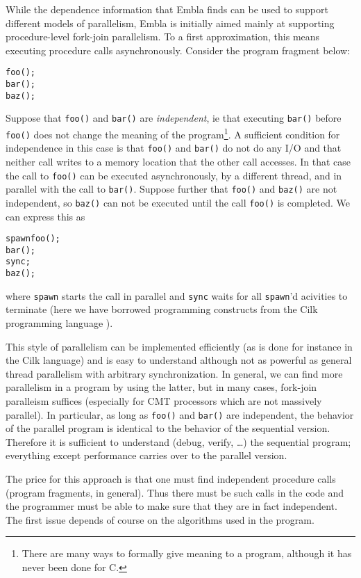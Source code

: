 While the dependence information that Embla finds can be used to 
support different models of parallelism, 
Embla is initially aimed mainly at supporting procedure-level 
fork-join parallelism. To a first approximation, this means executing 
procedure calls asynchronously. Consider the program fragment below:
\begin{alltt}
   foo();
   bar();
   baz();
\end{alltt}
Suppose that {\tt foo()} and {\tt bar()} are {\em independent}, ie that 
executing {\tt bar()} before {\tt foo()} does not change the meaning of
the program\footnote{There are many ways to formally give meaning to a
program, although it has never been done for C.}. A sufficient condition 
for independence
in this case is that {\tt foo()} and {\tt bar()} do not do any I/O and
that neither call writes to a memory location that the other call 
accesses. In that case the call to {\tt foo()} can be executed
asynchronously, 
by a different thread, and in parallel with the call to {\tt bar()}.
Suppose further that {\tt foo()} and {\tt baz()} are not independent,
so {\tt baz()} can not be executed until the call {\tt foo()} is completed.
We can express this as 
\begin{alltt}
   spawn foo();
   bar();
   sync;
   baz();
\end{alltt}
where {\tt spawn} starts the call in parallel and {\tt sync} waits
for all {\tt spawn}'d acivities to terminate (here we have borrowed 
programming constructs from the Cilk programming language 
\cite{frigo98implementation}).

This style of parallelism can be implemented efficiently (as is done
for instance in the Cilk language) and is easy to understand although
not as powerful as general thread parallelism with arbitrary
synchronization. In general, we can find more parallelism in a program 
by using the latter, but in many cases, fork-join paralleism suffices 
(especially for CMT processors which are not massively parallel).
In particular, as long as {\tt foo()} and {\tt bar()}
are independent, the behavior of the parallel program is identical to
the behavior of the sequential version. Therefore it is sufficient to
understand (debug, verify, \ldots) the sequential program; everything
except performance carries over to the parallel version.

The price for this approach is that one must find independent
procedure calls (program fragments, in general). Thus there must be
such calls in the code and the programmer must be able to make sure
that they are in fact independent. The first issue depends of course
on the algorithms used in the program.

